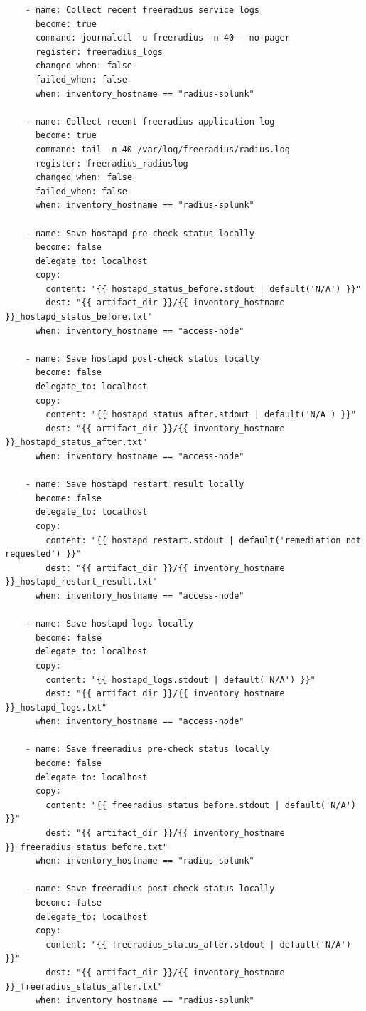\documentclass[11pt]{article}
\begin{document}
\begin{verbatim}
    - name: Collect recent freeradius service logs
      become: true
      command: journalctl -u freeradius -n 40 --no-pager
      register: freeradius_logs
      changed_when: false
      failed_when: false
      when: inventory_hostname == "radius-splunk"

    - name: Collect recent freeradius application log
      become: true
      command: tail -n 40 /var/log/freeradius/radius.log
      register: freeradius_radiuslog
      changed_when: false
      failed_when: false
      when: inventory_hostname == "radius-splunk"

    - name: Save hostapd pre-check status locally
      become: false
      delegate_to: localhost
      copy:
        content: "{{ hostapd_status_before.stdout | default('N/A') }}"
        dest: "{{ artifact_dir }}/{{ inventory_hostname }}_hostapd_status_before.txt"
      when: inventory_hostname == "access-node"

    - name: Save hostapd post-check status locally
      become: false
      delegate_to: localhost
      copy:
        content: "{{ hostapd_status_after.stdout | default('N/A') }}"
        dest: "{{ artifact_dir }}/{{ inventory_hostname }}_hostapd_status_after.txt"
      when: inventory_hostname == "access-node"

    - name: Save hostapd restart result locally
      become: false
      delegate_to: localhost
      copy:
        content: "{{ hostapd_restart.stdout | default('remediation not requested') }}"
        dest: "{{ artifact_dir }}/{{ inventory_hostname }}_hostapd_restart_result.txt"
      when: inventory_hostname == "access-node"

    - name: Save hostapd logs locally
      become: false
      delegate_to: localhost
      copy:
        content: "{{ hostapd_logs.stdout | default('N/A') }}"
        dest: "{{ artifact_dir }}/{{ inventory_hostname }}_hostapd_logs.txt"
      when: inventory_hostname == "access-node"

    - name: Save freeradius pre-check status locally
      become: false
      delegate_to: localhost
      copy:
        content: "{{ freeradius_status_before.stdout | default('N/A') }}"
        dest: "{{ artifact_dir }}/{{ inventory_hostname }}_freeradius_status_before.txt"
      when: inventory_hostname == "radius-splunk"

    - name: Save freeradius post-check status locally
      become: false
      delegate_to: localhost
      copy:
        content: "{{ freeradius_status_after.stdout | default('N/A') }}"
        dest: "{{ artifact_dir }}/{{ inventory_hostname }}_freeradius_status_after.txt"
      when: inventory_hostname == "radius-splunk"


\end{verbatim}
\end{document}
